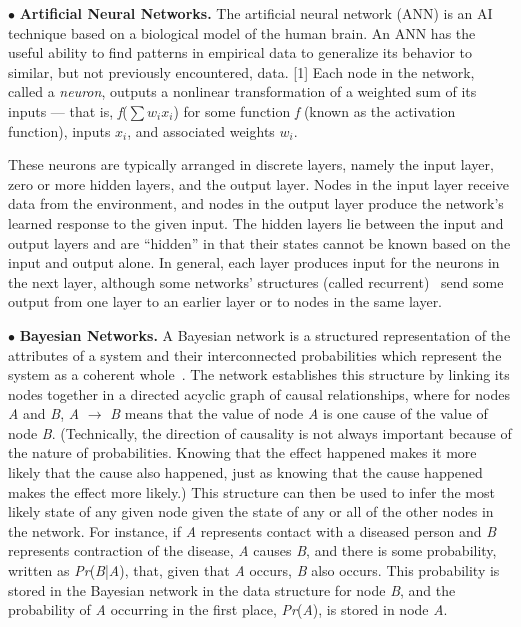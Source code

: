 \documentclass[conference]{IEEEtran}
\begin{document}
$\bullet$ {\bf Artificial Neural Networks.}
The artificial neural network (ANN) is an AI technique based on a biological model
of the human brain. An ANN has the useful ability to find patterns in empirical data
to generalize its behavior to similar, but not previously encountered, data. [1] Each
node in the network, called a \emph{neuron}, outputs a nonlinear transformation of a weighted
sum of its inputs --- that is, \emph{f}($\sum$$w_i$$x_i$) for some function \emph{f}
(known as the activation function), inputs $x_i$, and associated weights $w_i$.

These neurons are
typically arranged in discrete layers, namely the input layer, zero or more hidden
layers, and the output layer. Nodes in the input layer receive data from the
environment, and nodes in the output layer produce the network's learned response to
the given input. The hidden layers lie between the input and output layers and are
``hidden'' in that their states cannot be known based on the input and output alone. In
general, each layer produces input for the neurons in the next layer, although some
networks' structures (called recurrent)~\cite{Philips-Wren:12} send some output from one layer to an earlier layer or to nodes
in the same layer.

$\bullet$ {\bf Bayesian Networks.} A Bayesian network is a structured representation of the attributes of a system and their interconnected probabilities which represent the system as a coherent whole~\cite{Darwiche:10}.
The network establishes this structure  by linking its nodes together in a directed acyclic graph of causal relationships, where for nodes \emph{A} and \emph{B}, \emph{A} $\rightarrow$ \emph{B} means that the value of node \emph{A} is one cause of the value of node \emph{B}. (Technically, the direction of causality is not always important because of the nature of probabilities. Knowing that the effect happened makes it more likely that the cause also happened, just as knowing that the cause happened makes the effect more likely.) This  structure can then be used to infer the most likely state of  any given node given the state of any or all of the other  nodes in the network. For instance, if \emph{A} represents contact  with a diseased person and \emph{B} represents contraction of the  disease, \emph{A} causes \emph{B}, and there is some probability, written as \emph{Pr}(\emph{B}|\emph{A}), that, given that \emph{A} occurs, \emph{B} also occurs. This probability is stored in the Bayesian network in the data structure for node \emph{B}, and the probability of \emph{A} occurring in the first place, \emph{Pr}(\emph{A}), is stored in node \emph{A}.
\end{document}
